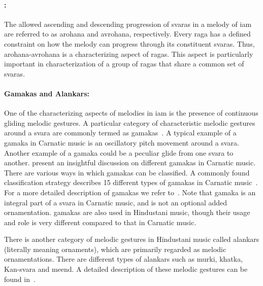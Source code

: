 \paragraph{:}

The allowed ascending and descending progression of \glspl{svara} in a melody of \gls{iam} are referred to as \gls{arohana} and \gls{avrohana}, respectively. Every \gls{raga} has a defined constraint on how the melody can progress through its constituent \glspl{svara}. Thus, \gls{arohana}-\gls{avrohana} is a characterizing aspect of \glspl{raga}. This aspect is particularly important in characterization of a group of \glspl{raga} that share a common set of \glspl{svara}. 

\paragraph{Gamakas and Alankars:} One of the characterizing aspects of melodies in \gls{iam} is the presence of continuous gliding melodic gestures. A particular category of characteristic melodic gestures around a \gls{svara} are commonly termed as \glspl{gamaka}~\citep{krishna2012carnatic}. A typical example of a \gls{gamaka} in Carnatic music is an oscillatory pitch movement around a \gls{svara}. Another example of a \gls{gamaka} could be a peculiar glide from one \gls{svara} to another. \cite{krishna2012carnatic} present an insightful discussion on different \glspl{gamaka} in Carnatic music. There are various ways in which \glspl{gamaka} can be classified. A commonly found classification strategy describes 15 different types of \glspl{gamaka} in Carnatic music~\citep{ramanathan1999musical,janakiraman2008essentials,narayanswami2011}. For a more detailed description of \glspl{gamaka} we refer to~\cite{narayanswami2011}. Note that \gls{gamaka} is an integral part of a \gls{svara} in Carnatic music, and is not an optional added ornamentation. \Glspl{gamaka} are also used in Hindustani music, though their usage and role is very different compared to that in Carnatic music. 

There is another category of melodic gestures in Hindustani music called \glspl{alankar} (literally meaning ornaments), which are primarily regarded as melodic ornamentations. There are different types of \glspl{alankar} such as \gls{murki}, \gls{khatka}, Kan-\gls{svara} and \gls{meend}. A detailed description of these melodic gestures can be found in~\cite{Bagchee1998}.


